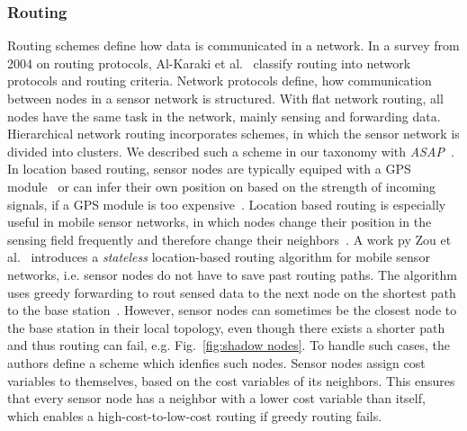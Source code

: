 
\subsubsection{Routing}
\label{sec:Routing}

Routing schemes define how data is communicated in a network. In a survey from
2004 on routing protocols, Al-Karaki et al.~\cite{al2004routing} classify
routing into network protocols and routing criteria. Network protocols define,
how communication between nodes in a sensor network is structured. With flat
network routing, all nodes have the same task in the network, mainly sensing
and forwarding data. Hierarchical network routing incorporates schemes, in
which the sensor network is divided into clusters. We described such a scheme
in our taxonomy with \textit{ASAP}~\cite{gedik2007asap}. In location based
routing, sensor nodes are typically equiped with a GPS
module~\cite{xu2001geography} or can infer their own position on based on the
strength of incoming signals, if a GPS module is too
expensive~\cite{hu2004localization}. Location based routing is especially
useful in mobile sensor networks, in which nodes change their position in the
sensing field frequently and therefore change their
neighbors~\cite{hu2004localization}. A work py Zou et al.~\cite{zou2004pager}
introduces a \textit{stateless} location-based routing algorithm for mobile
sensor networks, i.e. sensor nodes do not have to save past routing paths. The
algorithm uses greedy forwarding to rout sensed data to the next node on the
shortest path to the base station~\cite{stojmenovic2001loop}. However, sensor
nodes can sometimes be the closest node to the base station in their local
topology, even though there exists a shorter path and thus routing can fail,
e.g. Fig.~\ref{fig:shadow nodes}. To handle such cases, the authors define a
scheme which idenfies such nodes. Sensor nodes assign cost variables to
themselves, based on the cost variables of its neighbors. This ensures that
every sensor node has a neighbor with a lower cost variable than itself, which
enables a high-cost-to-low-cost routing if greedy routing fails. 

